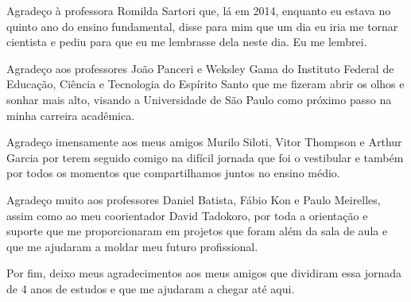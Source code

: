 \documentclass[a4paper,12pt,twoside,english,brazilian]{book}
\begin{document}
Agradeço à professora Romilda Sartori que, lá em 2014, enquanto eu estava no quinto ano do ensino fundamental, disse para mim que um dia eu iria me tornar cientista e pediu para que eu me lembrasse dela neste dia. Eu me lembrei.

Agradeço aos professores João Panceri e Weksley Gama do Instituto Federal de Educação, Ciência e Tecnologia do Espírito Santo que me fizeram abrir os olhos e sonhar mais alto, visando a Universidade de São Paulo como próximo passo na minha carreira acadêmica.

Agradeço imensamente aos meus amigos Murilo Siloti, Vitor Thompson e Arthur Garcia por terem seguido comigo na difícil jornada que foi o vestibular e também por todos os momentos que compartilhamos juntos no ensino médio.

Agradeço muito aos professores Daniel Batista, Fábio Kon e Paulo Meirelles, assim como ao meu coorientador David Tadokoro, por toda a orientação e suporte que me proporcionaram em projetos que foram além da sala de aula e que me ajudaram a moldar meu futuro profissional.

Por fim, deixo meus agradecimentos aos meus amigos que dividiram essa jornada de 4 anos de estudos e que me ajudaram a chegar até aqui.





\cleardoublepage


\newcommand\disablenewpage[1]{{\let\clearpage\par\let\cleardoublepage\par #1}}
\end{document}
